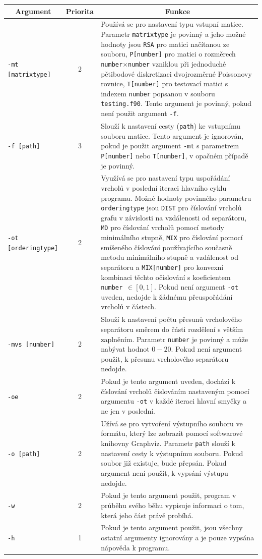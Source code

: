 \documentclass[11pt,american,czech,oneside]{book}
\theoremstyle{plain}
\theoremstyle{definition}
\begin{document}
\bigskip
{\noindent
\footnotesize
  \centering
  \renewcommand{\arraystretch}{1.15}
\begin{tabular}{|l|c|p{10cm}|}
  \hline
  \multicolumn{1}{|c|}{Argument}    & \multicolumn{1}{c|}{Priorita} & \multicolumn{1}{c|}{Funkce} \\
  \hline
  \texttt{-mt [matrixtype]}  & 2 & Používá se pro nastavení typu vstupní matice. Parametr \texttt{matrixtype} je povinný a jeho možné hodnoty jsou \texttt{RSA} pro matici načítanou ze souboru, \texttt{P[number]} pro matici o rozměrech \texttt{number}$\times$\texttt{number} vzniklou při jednoduché pětibodové diskretizaci dvojrozměrné Poissonovy rovnice, \texttt{T[number]} pro testovací matici s indexem \texttt{number} popsanou v souboru \texttt{testing.f90}. Tento argument je povinný, pokud není použit argument \texttt{-f}. \\
  \texttt{-f [path]}& 3 & Slouží k nastavení cesty (\texttt{path}) ke vstupnímu souboru matice. Tento argument je ignorován, pokud je použit argument \texttt{-mt} s parametrem \texttt{P[number]} nebo \texttt{T[number]}, v opačném případě je povinný.\\
  \texttt{-ot [orderingtype]}& 2 & Využívá se pro nastavení typu uspořádání vrcholů v poslední iteraci hlavního cyklu programu. Možné hodnoty povinného parametru \texttt{orderingtype} jsou \texttt{DIST} pro číslování vrcholů grafu v závislosti na vzdálenosti od separátoru, \texttt{MD} pro číslování vrcholů pomocí metody minimálního stupně, \texttt{MIX} pro číslování pomocí smíšeného číslování používajícího současně metodu minimálního stupně a vzdálenost od separátoru a \texttt{MIX[number]} pro konvexní kombinaci těchto očíslování s koeficientem \texttt{number}~$ \in [0,1]$. Pokud není argument \texttt{-ot} uveden, nedojde k žádnému přeuspořádání vrcholů v částech. \\
  \texttt{-mvs [number]}& 2 & Slouží k nastavení počtu přesunů vrcholového separátoru směrem do části rozdělení s větším zaplněním. Parametr \texttt{number} je povinný a může nabývat hodnot $0 - 20$. Pokud není argument použit, k přesunu vrcholového separátoru nedojde. \\
  \texttt{-oe}& 2 & Pokud je tento argument uveden, dochází k číslování vrcholů číslováním nastaveným pomocí argumentu \texttt{-ot} v každé iteraci hlavní smyčky a ne jen v poslední.\\
  \texttt{-o [path]}& 2 & Užívá se pro vytvoření výstupního souboru ve formátu, který lze zobrazit pomocí softwarové knihovny Graphviz. Parametr \texttt{path} slouží k nastavení cesty k výstupnímu souboru. Pokud soubor již existuje, bude přepsán. Pokud argument není použit, k vypsání výstupu nedojde.\\
  \texttt{-w}& 2 & Pokud je tento argument použit, program v průběhu svého běhu vypisuje informaci o tom, která jeho část právě probíhá. \\
  \texttt{-h}& 1 & Pokud je tento argument použit, jsou všechny ostatní argumenty ignorovány a je pouze vypsána nápověda k programu. \\
  \hline
\end{tabular}
}
\end{document}
